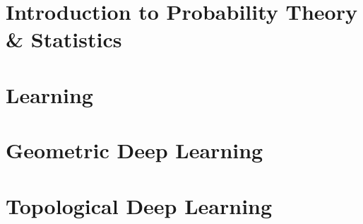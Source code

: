 \documentclass[../../deep-dive]{subfiles}
\begin{document}
\chapter{Introduction to Probability Theory \& Statistics}



\chapter{Learning}



\chapter{Geometric Deep Learning}


\chapter{Topological Deep Learning}


\end{document}
